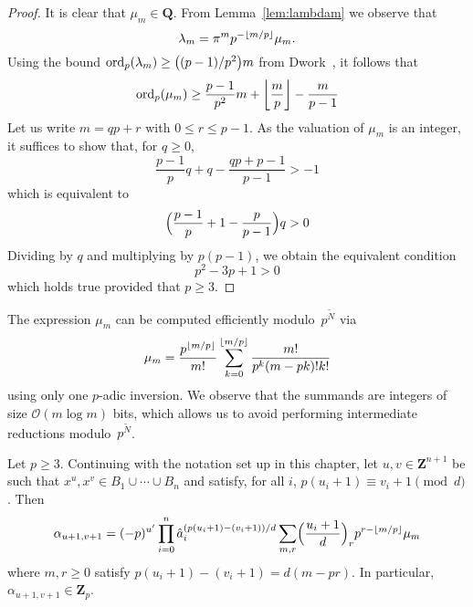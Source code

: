\begin{proof}
It is clear that $\mu_m \in \mathbf{Q}$.  From Lemma~\ref{lem:lambdam} 
we observe that 
\begin{equation*}
\lambda_m = \pi^m p^{- \left\lfloor m/p\right\rfloor} \mu_m.
\end{equation*}
Using the bound $\operatorname{ord}_p(\lambda_m) \geq \bigl((p-1)/p^2\bigr) m$ 
from Dwork~\citep[Pages~55--57]{Dwork62}, it follows that 
\begin{equation*}
\operatorname{ord}_p (\mu_m) \geq \frac{p-1}{p^2} m + \left\lfloor\frac{m}{p}\right\rfloor - \frac{m}{p-1}
\end{equation*}
Let us write $m = q p + r$ with $0 \leq r \leq p-1$.  As the valuation 
of $\mu_m$ is an integer, it suffices to show that, for $q \geq 0$, 
\begin{equation*}
\frac{p-1}{p} q + q - \frac{q p + p - 1}{p - 1} > -1
\end{equation*}
which is equivalent to 
\begin{equation*}
\Bigl( \frac{p-1}{p} + 1 - \frac{p}{p - 1} \Bigr) q > 0
\end{equation*}
Dividing by $q$ and multiplying by $p (p-1)$, we obtain the equivalent 
condition
\begin{equation*}
p^2 - 3p + 1 > 0
\end{equation*}
which holds true provided that $p \geq 3$.
\end{proof}

\begin{rem} \label{rem:01-03-mup}
The expression $\mu_m$ can be computed efficiently 
modulo~$p^{\tilde{N}}$ via
\begin{equation*}
\mu_m = \frac{p^{\left\lfloor m/p\right\rfloor}}{m!} 
    \sum_{k=0}^{\left\lfloor m/p\right\rfloor} \frac{m!}{p^k (m-pk)! k!}
\end{equation*}
using only one $p$-adic inversion.  We observe that the summands are 
integers of size $\mathcal{O}(m \log m)$ bits, which allows us to 
avoid performing intermediate reductions modulo~$p^{\tilde{N}}$.
\end{rem}

\begin{thm} \label{thm:alphap}
Let $p \geq 3$.  Continuing with the notation set up in this chapter, 
let $u, v \in \mathbf{Z}^{n+1}$ be such that 
$x^u, x^v \in B_1 \cup \dotsb \cup B_n$ and satisfy, 
for all $i$, $p (u_i + 1) \equiv v_i + 1 \pmod{d}$. 
Then 
\begin{equation} \label{eq:alphap.0}
\alpha_{u+1,v+1} = (-p)^{u'} \prod_{i=0}^n 
    \hat{a}_i^{(p (u_i + 1) - (v_i + 1))/d} \sum_{m,r} 
    \Bigl(\frac{u_i+1}{d}\Bigr)_r p^{r - \left\lfloor m/p\right\rfloor} \mu_m
\end{equation}
where $m, r \geq 0$ satisfy $p (u_i + 1) - (v_i + 1) = d (m - pr)$. 
In particular, $\alpha_{u+1, v+1} \in \mathbf{Z}_p$. 
\end{thm}

